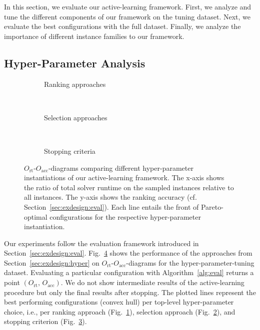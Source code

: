 \documentclass[runningheads]{llncs}
\begin{document}
In this section, we evaluate our active-learning framework.
First, we analyze and tune the different components of our framework on the tuning dataset.
Next, we evaluate the best configurations with the full dataset.
Finally, we analyze the importance of different instance families to our framework.

\subsection{Hyper-Parameter Analysis}

\begin{figure}[tbp!]
  \centering
  \begin{subfigure}{1.0\textwidth}
    \caption{Ranking approaches}
    \label{fig:annitraincolorranking}
  \end{subfigure}
  \\
  \vspace{0.2cm}
  \begin{subfigure}{1.0\textwidth}
    \caption{Selection approaches}
    \label{fig:annitraincolorselection}
  \end{subfigure}
  \\
  \vspace{0.2cm}
  \begin{subfigure}{1.0\textwidth}
    \caption{Stopping criteria}
    \label{fig:annitraincolorstopping}
  \end{subfigure}
  \caption{
    $O_{\operatorname{rt}}$-$O_{\operatorname{acc}}$-diagrams comparing different hyper-parameter instantiations of our active-learning framework.
    The x-axis shows the ratio of total solver runtime on the sampled instances relative to all instances.
    The y-axis shows the ranking accuracy (cf. Section~\ref{sec:exdesign:eval}).
    Each line entails the front of Pareto-optimal configurations for the respective hyper-parameter instantiation.
  }
  \label{fig:e2eallsolvers}
\end{figure}

Our experiments follow the evaluation framework introduced in Section~\ref{sec:exdesign:eval}.
Fig.~\ref{fig:e2eallsolvers} shows the performance of the approaches from Section~\ref{sec:exdesign:hyper} on $O_{\operatorname{rt}}$-$O_{\operatorname{acc}}$-diagrams for the hyper-parameter-tuning dataset.
Evaluating a particular configuration with Algorithm~\ref{alg:eval} returns a point $\left(O_{\operatorname{rt}},\, O_{\operatorname{acc}}\right)$.
We do not show intermediate results of the active-learning procedure but only the final results after stopping.
The plotted lines represent the best performing configurations (convex hull) per top-level hyper-parameter choice, i.e., per ranking approach (Fig.~\ref{fig:annitraincolorranking}), selection approach (Fig.~\ref{fig:annitraincolorselection}), and stopping criterion (Fig.~\ref{fig:annitraincolorstopping}).
\end{document}
